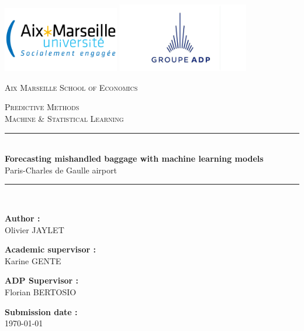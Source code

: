 \documentclass[12pt]{article}
\begin{document}
\newcommand{\HRule}{\rule{\linewidth}{0.5mm}} 

\thispagestyle{empty}

\begin{center}


\vfill
\begin{center}
  \includegraphics[width=0.38\textwidth]{AMU logo.png}
  \hfill
  \includegraphics[width=0.43\textwidth]{logo_Groupe_ADP.jpg}
\end{center}
\vfill
\vspace{0.5cm}
\textsc{\huge Aix Marseille School of Economics} \\[0.3cm]

\vspace{2cm}

\textsc{\large Predictive Methods}\\[0.1cm]
\textsc{\large Machine \& Statistical Learning} \\[0.1cm]


\vspace{1cm}


\HRule \\[0.4cm]
{ \huge \textbf{Forecasting mishandled baggage with machine learning models} \\[0.5cm] 
Paris-Charles de Gaulle airport
}\\[0.4cm]
\HRule \\[3cm]

\begin{centering}
\textbf{Author :}\\
Olivier JAYLET\break

\textbf{Academic supervisor :}\\
Karine GENTE \break

\textbf{ADP Supervisor :}\\
Florian BERTOSIO \break

\textbf{Submission date :}\\
\today
\end{centering}



\end{center}
\end{document}
